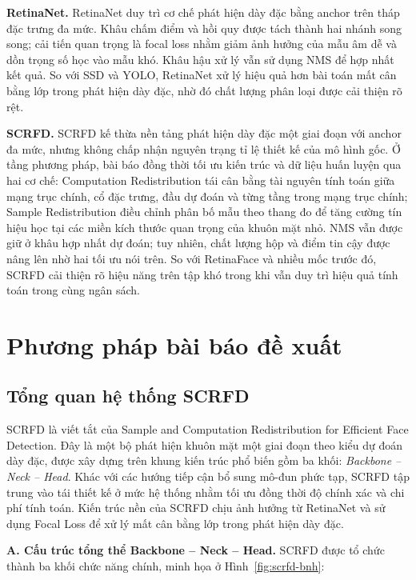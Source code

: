 \noindent\textbf{RetinaNet.}
RetinaNet duy trì cơ chế phát hiện dày đặc bằng anchor trên tháp đặc trưng đa mức.
Khâu chấm điểm và hồi quy được tách thành hai nhánh song song; cải tiến quan trọng là focal loss nhằm giảm ảnh hưởng của mẫu âm dễ và dồn trọng số học vào mẫu khó.
Khâu hậu xử lý vẫn sử dụng NMS để hợp nhất kết quả.
So với SSD và YOLO, RetinaNet xử lý hiệu quả hơn bài toán mất cân bằng lớp trong phát hiện dày đặc, nhờ đó chất lượng phân loại được cải thiện rõ rệt.  \cite{lin2017focal}

\noindent\textbf{SCRFD.}
SCRFD kế thừa nền tảng phát hiện dày đặc một giai đoạn với anchor đa mức, nhưng không chấp nhận nguyên trạng tỉ lệ thiết kế của mô hình gốc.
Ở tầng phương pháp, bài báo đồng thời tối ưu kiến trúc và dữ liệu huấn luyện qua hai cơ chế:
Computation Redistribution tái cân bằng tài nguyên tính toán giữa mạng trục chính, cổ đặc trưng, đầu dự đoán và từng tầng trong mạng trục chính;
Sample Redistribution điều chỉnh phân bố mẫu theo thang đo để tăng cường tín hiệu học tại các miền kích thước quan trọng của khuôn mặt nhỏ.
NMS vẫn được giữ ở khâu hợp nhất dự đoán; tuy nhiên, chất lượng hộp và điểm tin cậy được nâng lên nhờ hai tối ưu nói trên.
So với RetinaFace và nhiều mốc trước đó, SCRFD cải thiện rõ hiệu năng trên tập khó trong khi vẫn duy trì hiệu quả tính toán trong cùng ngân sách.  \cite{guo2022scrfd,deng2020retinaface}

\section{Phương pháp bài báo đề xuất}

\subsection{Tổng quan hệ thống SCRFD}

SCRFD là viết tắt của Sample and Computation Redistribution for Efficient Face Detection. Đây là một bộ phát hiện khuôn mặt một giai đoạn theo kiểu dự đoán dày đặc, được xây dựng trên khung kiến trúc phổ biến gồm ba khối: \textit{Backbone -- Neck -- Head}. 
Khác với các hướng tiếp cận bổ sung mô-đun phức tạp, SCRFD tập trung vào tái thiết kế ở mức hệ thống nhằm tối ưu đồng thời độ chính xác và chi phí tính toán. 
Kiến trúc nền của SCRFD chịu ảnh hưởng từ RetinaNet và sử dụng Focal Loss để xử lý mất cân bằng lớp trong phát hiện dày đặc. \cite{guo2022scrfd,lin2017focal}

\medskip
\noindent\textbf{A. Cấu trúc tổng thể Backbone -- Neck -- Head.}
SCRFD được tổ chức thành ba khối chức năng chính, minh họa ở Hình~\ref{fig:scrfd-bnh}:

